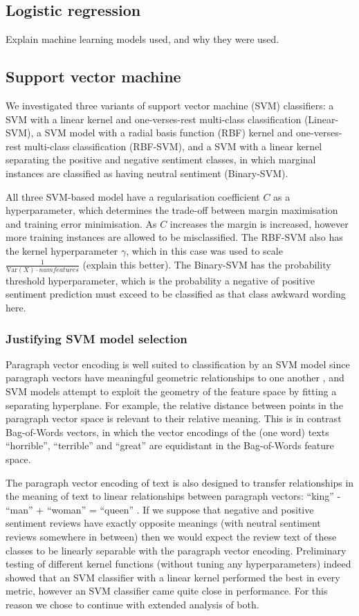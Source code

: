 \documentclass[11pt]{article}
\newcommand{\drafting}[1]{\textcolor{OliveGreen}{#1}}
\begin{document}
\subsection{Logistic regression} \label{subsec:method-lr}
\drafting{
Explain machine learning models used, and why they were used. 
}
\subsection{Support vector machine} \label{subsec:method-svm}
We investigated three variants of support vector machine (SVM) classifiers: a SVM with a linear kernel and one-verses-rest multi-class classification (Linear-SVM), a SVM model with a radial basis function (RBF) kernel and one-verses-rest multi-class classification (RBF-SVM), and a SVM with a linear kernel separating the positive and negative sentiment classes, in which marginal instances are classified as having neutral sentiment (Binary-SVM). 

All three SVM-based model have a regularisation coefficient $C$ as a hyperparameter, which determines the trade-off between margin maximisation and training error minimisation. As $C$ increases the margin is increased, however more training instances are allowed to be misclassified. The RBF-SVM also has the kernel hyperparameter $\gamma$, which in this case was used to scale $\frac{1}{\textrm{Var}(X) \cdot numfeatures}$ (\drafting{explain this better}). The Binary-SVM has the probability threshold hyperparameter, which is the probability a negative of positive sentiment prediction must exceed to be classified as that class \drafting{awkward wording here}.

\subsubsection*{Justifying SVM model selection}
Paragraph vector encoding is well suited to classification by an SVM model since paragraph vectors have meaningful geometric relationships to one another \cite{le_distributed_2014}, and SVM models attempt to exploit the geometry of the feature space by fitting a separating hyperplane. For example, the relative distance between points in the paragraph vector space is relevant to their relative meaning. This is in contrast Bag-of-Words vectors, in which the vector encodings of the (one word) texts ``horrible'', ``terrible'' and ``great'' are equidistant in the Bag-of-Words feature space.

The paragraph vector encoding of text is also designed to transfer relationships in the meaning of text to linear relationships between paragraph vectors: ``king'' - ``man'' + ``woman'' = ``queen'' \cite{le_distributed_2014}. If we suppose that negative and positive sentiment reviews have exactly opposite meanings (with neutral sentiment reviews somewhere in between) then we would expect the review text of these classes to be linearly separable with the paragraph vector encoding. Preliminary testing of different kernel functions (without tuning any hyperparameters) indeed showed that an SVM classifier with a linear kernel performed the best in every metric, however an SVM classifier came quite close in performance. For this reason we chose to continue with extended analysis of both.
\end{document}
